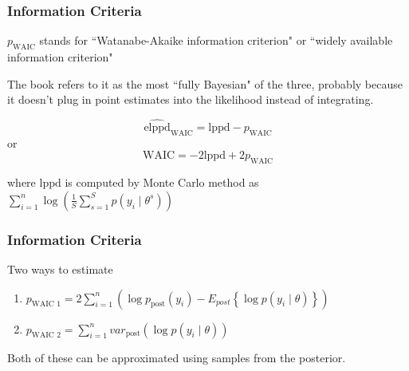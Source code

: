 \documentclass{beamer}
\begin{document}
\begin{frame}
\frametitle{Information Criteria}

$p_{\text{WAIC}}$ stands for ``Watanabe-Akaike information criterion" 
or ``widely available information criterion"
\newline

The book refers to it as the most ``fully Bayesian" of the three, probably because it doesn't plug in point estimates into the likelihood instead of integrating.

\[
\widehat{\text{elppd}}_{\text{WAIC}} = \text{lppd} - p_{\text{WAIC}}
\]
or
\[
\text{WAIC} = -2\text{lppd} + 2 p_{\text{WAIC}}
\]

where $ \text{lppd}$ is computed by Monte Carlo method as $\sum_{i=1}^n \log \left(\frac{1}{S}\sum_{s=1}^S p(y_i \mid \theta^s) \right)$

\end{frame}

\begin{frame}
\frametitle{Information Criteria}

Two ways to estimate 

\begin{enumerate}
\item $p_{\text{WAIC 1}} = 2\sum_{i=1}^n \left( \log p_{\text{post}}(y_i) - E_{post} \left\{  \log p(y_i \mid \theta) \right\} \right)$
\item $p_{\text{WAIC 2}} = \sum_{i=1}^n var_{\text{post}}(\log p(y_i \mid \theta))$
\end{enumerate}

Both of these can be approximated using samples from the posterior.

\end{frame}



\end{document}
